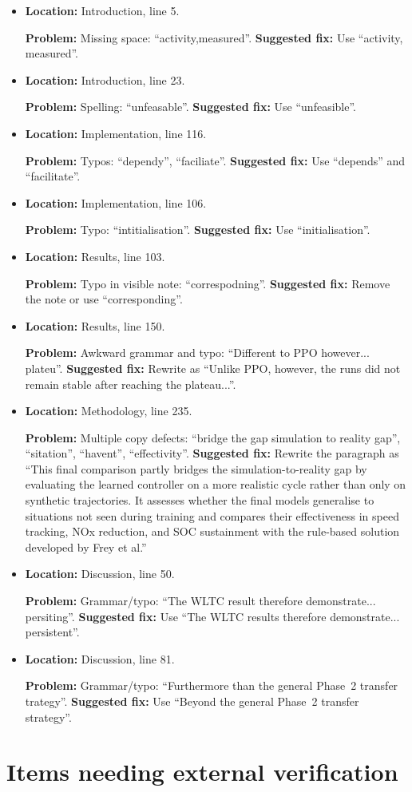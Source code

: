 \documentclass[11pt,a4paper]{article}
\newcommand{\loc}[1]{\textbf{Location:} #1\par}
\newcommand{\problem}{\textbf{Problem:} }
\newcommand{\fix}{\textbf{Suggested fix:} }
\begin{document}
\begin{itemize}
  \item \loc{Introduction, line 5.}\problem Missing space: ``activity,measured''. \fix Use ``activity, measured''.
  \item \loc{Introduction, line 23.}\problem Spelling: ``unfeasable''. \fix Use ``unfeasible''.
  \item \loc{Implementation, line 116.}\problem Typos: ``dependy'', ``faciliate''. \fix Use ``depends'' and ``facilitate''.
  \item \loc{Implementation, line 106.}\problem Typo: ``intitialisation''. \fix Use ``initialisation''.
  \item \loc{Results, line 103.}\problem Typo in visible note: ``correspodning''. \fix Remove the note or use ``corresponding''.
  \item \loc{Results, line 150.}\problem Awkward grammar and typo: ``Different to PPO however... plateu''. \fix Rewrite as ``Unlike PPO, however, the runs did not remain stable after reaching the plateau...''.
  \item \loc{Methodology, line 235.}\problem Multiple copy defects: ``bridge the gap simulation to reality gap'', ``sitation'', ``havent'', ``effectivity''. \fix Rewrite the paragraph as ``This final comparison partly bridges the simulation-to-reality gap by evaluating the learned controller on a more realistic cycle rather than only on synthetic trajectories. It assesses whether the final models generalise to situations not seen during training and compares their effectiveness in speed tracking, NOx reduction, and SOC sustainment with the rule-based solution developed by Frey et al.''
  \item \loc{Discussion, line 50.}\problem Grammar/typo: ``The WLTC result therefore demonstrate... persiting''. \fix Use ``The WLTC results therefore demonstrate... persistent''.
  \item \loc{Discussion, line 81.}\problem Grammar/typo: ``Furthermore than the general Phase~2 transfer trategy''. \fix Use ``Beyond the general Phase~2 transfer strategy''.
\end{itemize}

\section*{Items needing external verification}
\end{document}
